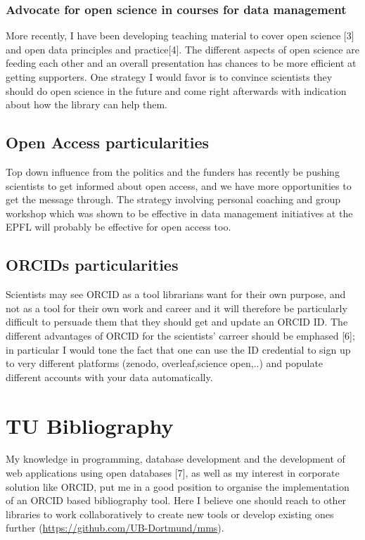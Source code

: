 \begin{multicols}{2}
\subsubsection*{Advocate for open science in courses for data management}
More recently, I have been developing teaching material to cover open science [3] and open data principles and practice[4]. The different aspects of open science are feeding each other and an overall presentation has chances to be more efficient at getting supporters.  One strategy I would 
favor is to convince scientists they should do open science in the future and come right afterwards with indication about how the library can help them.

\subsection*{Open Access particularities}
Top down influence from the politics and the funders has recently be pushing scientists to get informed about open access, and we have more opportunities to get the message through. The strategy involving personal coaching and group workshop which was shown to be effective in data management initiatives at the EPFL will probably be effective for open access too.

\subsection*{ORCIDs particularities}
Scientists may see ORCID as a tool librarians want for their own purpose, and not as a tool for their own work and career and it will therefore be particularly difficult to persuade them that they should get and update an ORCID ID. The different advantages of ORCID for the scientists' carreer should be emphased [6]; in particular I would tone the fact that one can use the ID credential to sign up to very different platforms (zenodo, overleaf,science open,..) and populate different accounts with your data automatically.



\section{TU Bibliography}

My knowledge in programming, database development and the development of web applications using open databases [7], as well as my interest in corporate solution like ORCID, put me in a good position to organise the implementation of an ORCID based bibliography tool. Here I believe one should reach to other libraries to work collaboratively to create new tools or develop existing ones further (\url{https://github.com/UB-Dortmund/mms}).


\end{multicols}
